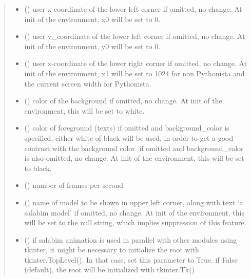 \documentclass[letterpaper,10pt,english]{sphinxmanual}
\begin{document}
\begin{fulllineitems}
\begin{fulllineitems}
\begin{quote}
\begin{description}
\begin{itemize}
\item {} 
 () \textendash{} user x-coordinate of the lower left corner 
if omitted, no change. At init of the environment, x0 will be set to 0.

\item {} 
 () \textendash{} user y\_coordinate of the lower left corner 
if omitted, no change. At init of the environment, y0 will be set to 0.

\item {} 
 () \textendash{} user x-coordinate of the lower right corner 
if omitted, no change. At init of the environment, x1 will be set to 1024
for non Pythonista and the current screen width for Pythonista.

\item {} 
 () \textendash{} color of the background 
if omitted, no change. At init of the environment, this will be set to white.

\item {} 
 () \textendash{} color of foreground (texts) 
if omitted and background\_color is specified, either white of black will be used,
in order to get a good contrast with the background color. 
if omitted and background\_color is also omitted, no change. At init of the
environment, this will be set to black.

\item {} 
 () \textendash{} number of frames per second

\item {} 
 () \textendash{} name of model to be shown in upper left corner,
along with text ‘a salabim model’ 
if omitted, no change. At init of the environment, this will be set
to the null string, which implies suppression of this feature.

\item {} 
 () \textendash{} if salabim animation is used in parallel with
other modules using tkinter, it might be necessary to
initialize the root with tkinter.TopLevel().
In that case, set this parameter to True. 
if False (default), the root will be initialized with tkinter.Tk()


\end{itemize}
\end{description}
\end{quote}
\end{fulllineitems}
\end{fulllineitems}
\end{document}

